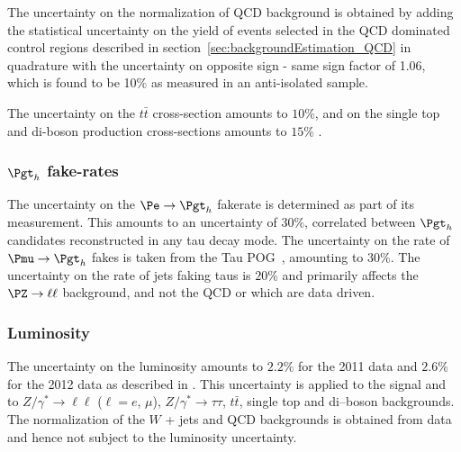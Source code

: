 The uncertainty on the normalization of QCD background is obtained by adding the
statistical uncertainty on the yield of events selected in the QCD dominated control regions
described in section~\ref{sec:backgroundEstimation_QCD} in quadrature with the
uncertainty on opposite sign - same sign factor of 1.06, which is found to be
10$\%$ as measured in an anti-isolated sample.

The uncertainty on the $t \bar{t}$ cross-section amounts to $10\%$, and on the single top and di-boson
production cross-sections amounts to $15\%$ \cite{Chatrchyan:2013oev,Chatrchyan:2012ep}.
 
\subsubsection{\textbf{$\Pgt_{h}$ fake-rates}} 
The uncertainty on the $\Pe \to \Pgt_{h}$ fakerate is determined as part of
its measurement. This amounts to an uncertainty of $30\%$, correlated between
$\Pgt_{h}$ candidates reconstructed in any tau decay mode. 
The uncertainty on the rate of $\Pmu \to \Pgt_{h}$
fakes is taken from the Tau POG~\cite{TauIDRecommendation}, amounting to $30\%$.
The uncertainty on the rate of jets faking taus is $20\%$ and primarily affects
the $\PZ\to\ell\ell$ background, and not the QCD or \WJets which are data
driven.

\subsubsection{\textbf{Luminosity}} 
The uncertainty on the luminosity amounts to $2.2\%$ for the 2011 data and
$2.6\%$ for the 2012 data as described in \cite{CMS-PAS-SMP-12-008,CMS-PAS-LUM-13-001}.
This uncertainty is applied to the signal and to $Z/\gamma^{*} \to \ell\ell$ ($\ell = e$, $\mu$), $Z/\gamma^{*} \to
\tau\tau$, $t \bar{t}$, single top and di--boson backgrounds. 
The normalization of the $W$ + jets and QCD backgrounds is obtained from data and hence not subject to the luminosity uncertainty.

